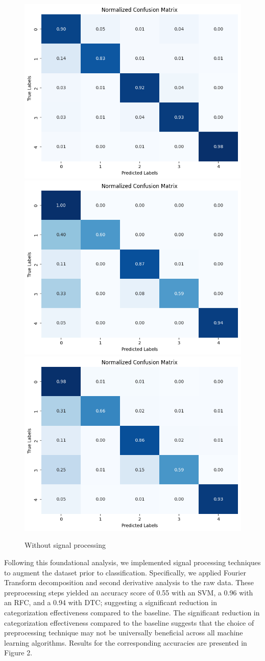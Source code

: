 \documentclass[runningheads]{llncs}
\begin{document}
\begin{figure}
    \centering
    \includegraphics[width=0.4\linewidth]{figs/svc_crud.png}
    \includegraphics[width=0.4\linewidth]{figs/random_for_crud.png}
    \includegraphics[width=0.4\linewidth]{figs/d_tree_crud.png}
    
    \caption{Without signal processing}
    \label{fig:crude_data}
\end{figure}

Following this foundational analysis, we implemented signal processing techniques to augment the dataset prior to classification. Specifically, we applied Fourier Transform decomposition and second derivative analysis to the raw data. These preprocessing steps yielded an accuracy score of 0.55 with an SVM, a 0.96 with an RFC, and a 0.94 with DTC; suggesting a significant reduction in categorization effectiveness compared to the baseline. The significant reduction in categorization effectiveness compared to the baseline suggests that the choice of preprocessing technique may not be universally beneficial across all machine learning algorithms. Results for the corresponding accuracies are presented in Figure 2.
\end{document}
